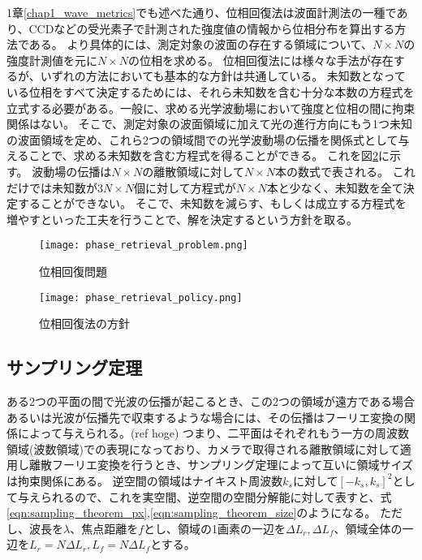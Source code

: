 1章\ref{chap1_wave_metrics}でも述べた通り、位相回復法は波面計測法の一種であり、CCDなどの受光素子で計測された強度値の情報から位相分布を算出する方法である。
より具体的には、測定対象の波面の存在する領域について、$N \times N$の強度計測値を元に$N \times N$の位相を求める。
位相回復法には様々な手法が存在するが、いずれの方法においても基本的な方針は共通している。
未知数となっている位相をすべて決定するためには、それら未知数を含む十分な本数の方程式を立式する必要がある。一般に、求める光学波動場において強度と位相の間に拘束関係はない。
そこで、測定対象の波面領域に加えて光の進行方向にもう1つ未知の波面領域を定め、これら2つの領域間での光学波動場の伝播を関係式として与えることで、求める未知数を含む方程式を得ることができる。
これを図\ref{fig:phase_retrieval_policy}に示す。
波動場の伝播は$N \times N$の離散領域に対して$N \times N$本の数式で表される。
これだけでは未知数が$3N \times N$個に対して方程式が$N \times N$本と少なく、未知数を全て決定することができない。
そこで、未知数を減らす、もしくは成立する方程式を増やすといった工夫を行うことで、解を決定するという方針を取る。

\begin{figure}[!ht]
\centering
\texttt{[image: phase\_retrieval\_problem.png]}
\caption{位相回復問題}
\label{fig:phase_retrieval_problem}
\end{figure}

\begin{figure}[!ht]
\centering
\texttt{[image: phase\_retrieval\_policy.png]}
\caption{位相回復法の方針}
\label{fig:phase_retrieval_policy}
\end{figure}

\subsection{サンプリング定理}
\label{chap3_sampling_theorem}

ある2つの平面の間で光波の伝播が起こるとき、この2つの領域が遠方である場合あるいは光波が伝播先で収束するような場合には、その伝播はフーリエ変換の関係によって与えられる。(ref hoge)
つまり、二平面はそれぞれもう一方の周波数領域(波数領域)での表現になっており、カメラで取得される離散領域に対して適用し離散フーリエ変換を行うとき、サンプリング定理によって互いに領域サイズは拘束関係にある。
逆空間の領域はナイキスト周波数$k_s$に対して$[-k_s, k_s]^2$として与えられるので、これを実空間、逆空間の空間分解能に対して表すと、式\ref{eqn:sampling_theorem_px},\ref{eqn:sampling_theorem_size}のようになる。
ただし、波長を$\lambda$、焦点距離を$f$とし、領域の1画素の一辺を$\Delta L_r, \Delta L_f$、領域全体の一辺を$L_r=N \Delta L_r, L_f = N \Delta L_f$とする。

